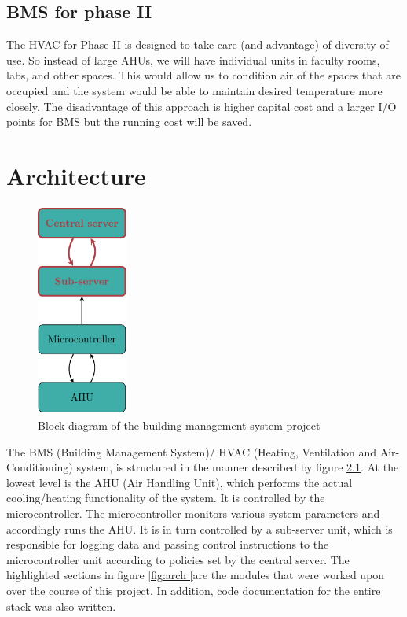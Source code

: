 \documentclass[letterpaper,11pt]{report}
\begin{document}
\section{BMS for phase II}
The HVAC for Phase II is designed to take care (and advantage) of diversity of use. So instead of large AHUs, we will have individual units in faculty rooms, labs, and other spaces. This would allow us to condition air of the spaces that are occupied and the system would be able to maintain desired temperature more closely. The disadvantage of this approach is higher capital cost and a larger I/O points for BMS but the running cost will be saved.

\newpage
\chapter{Architecture}\label{chapter:architecture}
\onehalfspacing
\begin{figure}[h]
\includegraphics[width=3cm, height=7cm]{arch}
\centering
\captionsetup{justification=centering}
\caption{Block diagram of the building management system project}
\label{fig:arch}
\end{figure}
The BMS (Building Management System)/ HVAC (Heating, Ventilation and Air-Conditioning) system, is structured in the manner described by figure \ref{fig:arch}. At the lowest level is the AHU (Air Handling Unit), which performs the actual cooling/heating functionality of the system. It is controlled by the microcontroller. The microcontroller monitors various system parameters and accordingly runs the AHU. It is in turn controlled by a sub-server unit, which is responsible for logging data and passing control instructions to the microcontroller unit according to policies set by the central server. The highlighted sections in figure \ref{fig:arch }are the modules that were worked upon over the course of this project. In addition, code documentation for the entire stack was also written.
\end{document}
